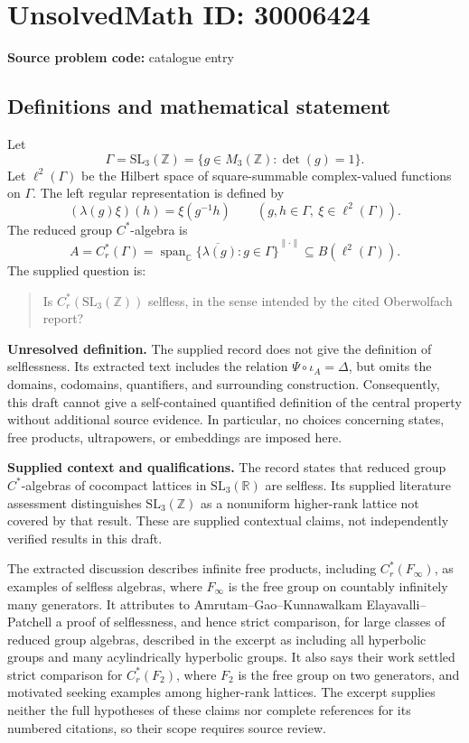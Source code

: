 \documentclass[11pt]{article}
\newcommand{\Z}{\mathbb{Z}}
\newcommand{\R}{\mathbb{R}}
\newcommand{\C}{\mathbb{C}}
\begin{document}
\section*{UnsolvedMath ID: 30006424}
\textbf{Source problem code:} catalogue entry
\subsection{Definitions and mathematical statement}
Let
\[
\Gamma=\mathrm{SL}_3(\Z)=\{g\in M_3(\Z):\det(g)=1\}.
\]
Let \(\ell^2(\Gamma)\) be the Hilbert space of square-summable complex-valued functions on \(\Gamma\). The left regular representation is defined by
\[
(\lambda(g)\xi)(h)=\xi(g^{-1}h)
\qquad(g,h\in\Gamma,\ \xi\in\ell^2(\Gamma)).
\]
The reduced group \(C^*\)-algebra is
\[
A=C_r^*(\Gamma)
=\overline{\operatorname{span}_{\C}\{\lambda(g):g\in\Gamma\}}^{\|\cdot\|}
\subseteq B(\ell^2(\Gamma)).
\]
The supplied question is:
\begin{quote}
Is \(C_r^*(\mathrm{SL}_3(\Z))\) selfless, in the sense intended by the cited Oberwolfach report?
\end{quote}
\textbf{Unresolved definition.} The supplied record does not give the definition of selflessness. Its extracted text includes the relation \(\Psi\circ\iota_A=\Delta\), but omits the domains, codomains, quantifiers, and surrounding construction. Consequently, this draft cannot give a self-contained quantified definition of the central property without additional source evidence. In particular, no choices concerning states, free products, ultrapowers, or embeddings are imposed here.

\textbf{Supplied context and qualifications.} The record states that reduced group \(C^*\)-algebras of cocompact lattices in \(\mathrm{SL}_3(\R)\) are selfless. Its supplied literature assessment distinguishes \(\mathrm{SL}_3(\Z)\) as a nonuniform higher-rank lattice not covered by that result. These are supplied contextual claims, not independently verified results in this draft.

The extracted discussion describes infinite free products, including \(C_r^*(F_\infty)\), as examples of selfless algebras, where \(F_\infty\) is the free group on countably infinitely many generators. It attributes to Amrutam--Gao--Kunnawalkam Elayavalli--Patchell a proof of selflessness, and hence strict comparison, for large classes of reduced group algebras, described in the excerpt as including all hyperbolic groups and many acylindrically hyperbolic groups. It also says their work settled strict comparison for \(C_r^*(F_2)\), where \(F_2\) is the free group on two generators, and motivated seeking examples among higher-rank lattices. The excerpt supplies neither the full hypotheses of these claims nor complete references for its numbered citations, so their scope requires source review.
\end{document}
